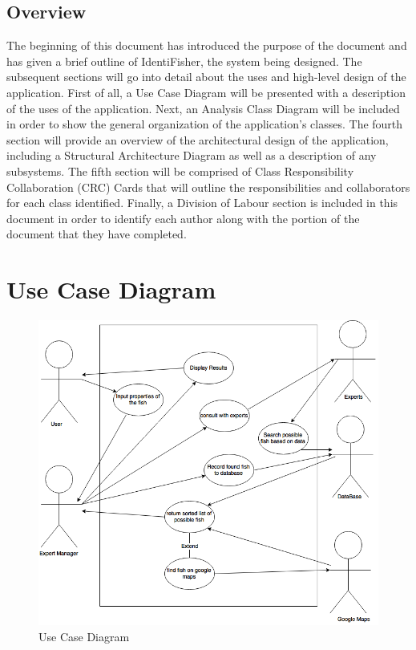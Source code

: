 \documentclass[]{article}
\begin{document}
\subsection{Overview}
\label{sub:overview}
	The beginning of this document has introduced the purpose of the document and has given a brief outline of IdentiFisher, the system being designed. The subsequent sections will go into detail about the uses and high-level design of the application. First of all, a Use Case Diagram will be presented with a description of the uses of the application. Next, an Analysis Class Diagram will be included in order to show the general organization of the application's classes. The fourth section will provide an overview of the architectural design of the application, including a Structural Architecture Diagram as well as a description of any subsystems. The fifth section will be comprised of Class Responsibility Collaboration (CRC) Cards that will outline the responsibilities and collaborators for each class identified. Finally, a Division of Labour section is included in this document in order to identify each author along with the portion of the document that they have completed.


\section{Use Case Diagram}
\label{sec:use_case_diagram}
\begin{figure}
\includegraphics[width=\textwidth]{UseCase}
\caption{Use Case Diagram}
\end{figure}
\end{document}
